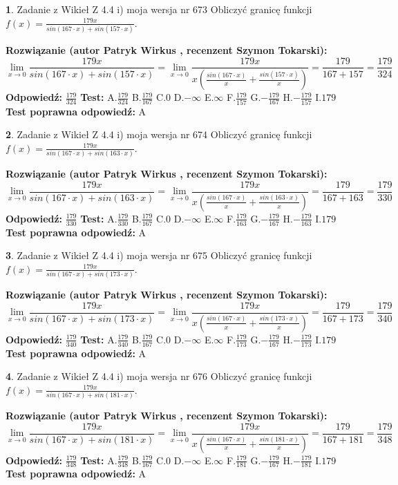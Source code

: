 \documentclass[12pt, a4paper]{article}
\theoremstyle{definition} %
\newtheorem{zad}{}
\newcommand{\zadStart}[1]{\begin{zad}#1\newline}
\newcommand{\zadStop}{\end{zad}}
\newcommand{\rozwStart}[2]{\noindent \textbf{Rozwiązanie (autor #1 , recenzent #2): }\newline}
\newcommand{\rozwStop}{\newline}
\newcommand{\odpStart}{\noindent \textbf{Odpowiedź:}\newline}
\newcommand{\odpStop}{\newline}
\newcommand{\testStart}{\noindent \textbf{Test:}\newline}
\newcommand{\testStop}{\newline}
\newcommand{\kluczStart}{\noindent \textbf{Test poprawna odpowiedź:}\newline}
\newcommand{\kluczStop}{\newline}
\begin{document}
\zadStart{Zadanie z Wikieł Z 4.4 i) moja wersja nr 673}
Obliczyć granicę funkcji $f(x)=\frac{179x}{sin(167\cdot x) +sin(157\cdot x)}$.
\zadStop
\rozwStart{Patryk Wirkus}{Szymon Tokarski}
$$\lim\limits_{x\to 0}\frac{179x}{sin(167\cdot x) +sin(157\cdot x)}=\lim\limits_{x\to 0}\frac{179x}{x(\frac{sin(167\cdot x)}{x}+\frac{sin(157\cdot x)}{x})}=\frac{179}{167+157} = \frac{179}{324}$$
\rozwStop
\odpStart
$\frac{179}{324}$
\odpStop
\testStart
A.$\frac{179}{324}$
B.$\frac{179}{167}$
C.$0$
D.$-\infty$
E.$\infty$
F.$\frac{179}{157}$
G.$-\frac{179}{167}$
H.$-\frac{179}{157}$
I.$179$
\testStop
\kluczStart
A
\kluczStop



\zadStart{Zadanie z Wikieł Z 4.4 i) moja wersja nr 674}
Obliczyć granicę funkcji $f(x)=\frac{179x}{sin(167\cdot x) +sin(163\cdot x)}$.
\zadStop
\rozwStart{Patryk Wirkus}{Szymon Tokarski}
$$\lim\limits_{x\to 0}\frac{179x}{sin(167\cdot x) +sin(163\cdot x)}=\lim\limits_{x\to 0}\frac{179x}{x(\frac{sin(167\cdot x)}{x}+\frac{sin(163\cdot x)}{x})}=\frac{179}{167+163} = \frac{179}{330}$$
\rozwStop
\odpStart
$\frac{179}{330}$
\odpStop
\testStart
A.$\frac{179}{330}$
B.$\frac{179}{167}$
C.$0$
D.$-\infty$
E.$\infty$
F.$\frac{179}{163}$
G.$-\frac{179}{167}$
H.$-\frac{179}{163}$
I.$179$
\testStop
\kluczStart
A
\kluczStop



\zadStart{Zadanie z Wikieł Z 4.4 i) moja wersja nr 675}
Obliczyć granicę funkcji $f(x)=\frac{179x}{sin(167\cdot x) +sin(173\cdot x)}$.
\zadStop
\rozwStart{Patryk Wirkus}{Szymon Tokarski}
$$\lim\limits_{x\to 0}\frac{179x}{sin(167\cdot x) +sin(173\cdot x)}=\lim\limits_{x\to 0}\frac{179x}{x(\frac{sin(167\cdot x)}{x}+\frac{sin(173\cdot x)}{x})}=\frac{179}{167+173} = \frac{179}{340}$$
\rozwStop
\odpStart
$\frac{179}{340}$
\odpStop
\testStart
A.$\frac{179}{340}$
B.$\frac{179}{167}$
C.$0$
D.$-\infty$
E.$\infty$
F.$\frac{179}{173}$
G.$-\frac{179}{167}$
H.$-\frac{179}{173}$
I.$179$
\testStop
\kluczStart
A
\kluczStop



\zadStart{Zadanie z Wikieł Z 4.4 i) moja wersja nr 676}
Obliczyć granicę funkcji $f(x)=\frac{179x}{sin(167\cdot x) +sin(181\cdot x)}$.
\zadStop
\rozwStart{Patryk Wirkus}{Szymon Tokarski}
$$\lim\limits_{x\to 0}\frac{179x}{sin(167\cdot x) +sin(181\cdot x)}=\lim\limits_{x\to 0}\frac{179x}{x(\frac{sin(167\cdot x)}{x}+\frac{sin(181\cdot x)}{x})}=\frac{179}{167+181} = \frac{179}{348}$$
\rozwStop
\odpStart
$\frac{179}{348}$
\odpStop
\testStart
A.$\frac{179}{348}$
B.$\frac{179}{167}$
C.$0$
D.$-\infty$
E.$\infty$
F.$\frac{179}{181}$
G.$-\frac{179}{167}$
H.$-\frac{179}{181}$
I.$179$
\testStop
\kluczStart
A
\kluczStop
\end{document}

